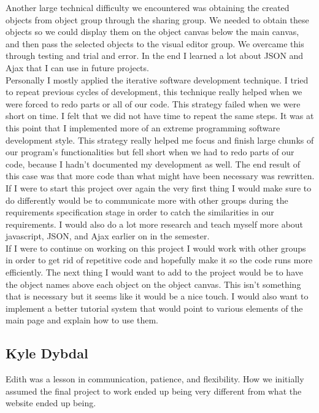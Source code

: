 \documentclass[12pt]{article}
\begin{document}
Another large technical difficulty we encountered was obtaining the created objects from object group through the sharing group. We needed to obtain these objects so we could display them on the object canvas below the main canvas, and then pass the selected objects to the visual editor group. We overcame this through testing and trial and error. In the end I learned a lot about JSON and Ajax that I can use in future projects. \\
Personally I mostly applied the iterative software development technique. I tried to repeat previous cycles of development, this technique really helped when we were forced to redo parts or all of our code. This strategy failed when we were short on time. I felt that we did not have time to repeat the same steps. It was at this point that I implemented more of an extreme programming software development style. This strategy really helped me focus and finish large chunks of our program's functionalities but fell short when we had to redo parts of our code, because I hadn't documented my development as well. The end result of this case was that more code than what might have been necessary was rewritten. \\
If I were to start this project over again the very first thing I would make sure to do differently would be to communicate more with other groups during the requirements specification stage in order to catch the similarities in our requirements. I would also do a lot more research and teach myself more about javascript, JSON, and Ajax earlier on in the semester. \\
If I were to continue on working on this project I would work with other groups in order to get rid of repetitive code and hopefully make it so the code runs more efficiently. The next thing I would want to add to the project would be to have the object names above each object on the object canvas. This isn't something that is necessary but it seems like it would be a nice touch. I would also want to implement a better tutorial system that would point to various elements of the main page and explain how to use them.

\subsection{Kyle Dybdal}
Edith was a lesson in communication, patience, and flexibility. How we initially assumed the final project to work ended up being very different from what the website ended up being. 
\end{document}
